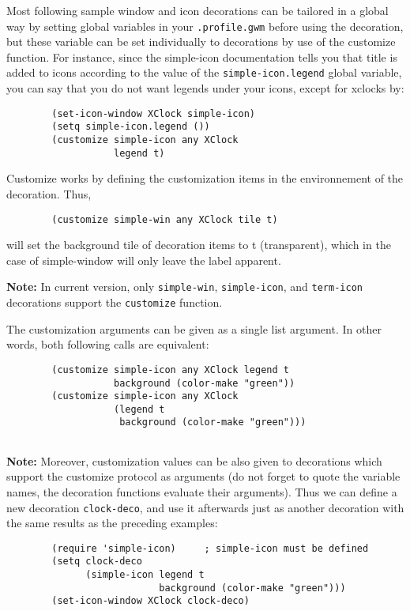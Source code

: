 Most following sample window and icon decorations can be  tailored in a
global way by setting global variables in your \verb|.profile.gwm| before
using the decoration, but these variable can be set individually to
decorations by use of the customize function. For instance, since the
simple-icon documentation tells you that title is added to icons according to
the value of the \verb|simple-icon.legend| global variable, you can say that
you do not want legends under your icons, except for xclocks by:

{\exemplefont\begin{verbatim}
        (set-icon-window XClock simple-icon)
        (setq simple-icon.legend ())
        (customize simple-icon any XClock 
                   legend t)
\end{verbatim}}

Customize works by defining the customization items in the environnement of
the decoration. Thus, 
{\exemplefont\begin{verbatim}
        (customize simple-win any XClock tile t)
\end{verbatim}}
will set the background tile of decoration items to t (transparent), which in
the case of simple-window will only leave the label apparent.

{\bf Note:} In current version, only \verb|simple-win|, \verb|simple-icon|,
and \verb|term-icon| decorations support the \verb|customize| function.

The customization arguments can be given as a single list argument. In other
words, both following calls are equivalent:

{\exemplefont\begin{verbatim}
        (customize simple-icon any XClock legend t 
                   background (color-make "green"))
        (customize simple-icon any XClock 
                   (legend t 
                    background (color-make "green")))
                    
\end{verbatim}}

{\bf Note:} Moreover, customization values can be also given to decorations
which support the customize protocol as arguments (do not forget to quote the
variable names, the decoration functions evaluate their arguments). Thus we
can define a new decoration \verb"clock-deco", and use it afterwards just as
another decoration with the same results as the preceding examples:

{\exemplefont\begin{verbatim}
        (require 'simple-icon)     ; simple-icon must be defined
        (setq clock-deco 
              (simple-icon legend t 
                           background (color-make "green")))
        (set-icon-window XClock clock-deco)                 
\end{verbatim}}

